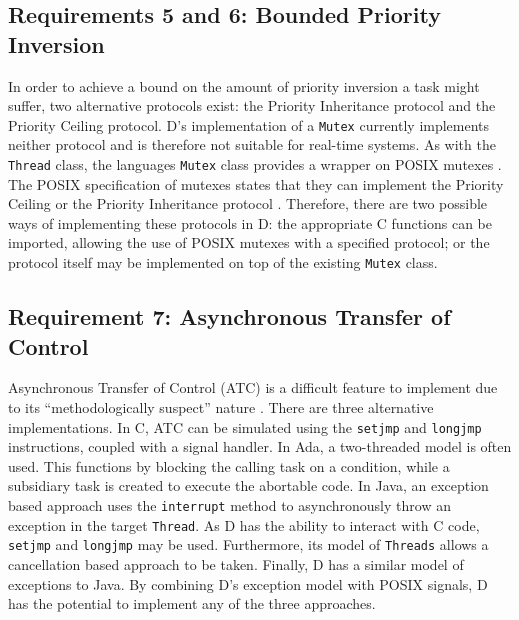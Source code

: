 \subsection{Requirements 5 and 6: Bounded Priority Inversion} %
In order to achieve a bound on the amount of priority inversion a task
might suffer, two alternative protocols exist: the Priority Inheritance protocol and the
Priority Ceiling protocol. D's implementation of a \texttt{Mutex} currently
implements neither protocol and is therefore not suitable for real-time systems.
As with the \texttt{Thread} class, the languages \texttt{Mutex} class provides 
a wrapper on POSIX mutexes \cite{dlang-github-mutex}. 
The POSIX specification of mutexes states that
they can implement the Priority Ceiling or the Priority Inheritance protocol 
\cite{mutex-setprotocol}. Therefore, there are two possible ways of
implementing these protocols in D: 
the appropriate C functions can be imported, allowing the
use of POSIX mutexes with a specified protocol; or the protocol itself may be
implemented on top of the existing \texttt{Mutex} class. 

\subsection{Requirement 7: Asynchronous Transfer of Control} %
Asynchronous Transfer of Control (ATC) is a difficult feature to implement due to
its ``methodologically suspect'' nature \cite{Brosgol:2002:ATC}. There are
three alternative implementations. In C, ATC can be simulated using the
\texttt{setjmp} and \texttt{longjmp} instructions, coupled with a signal
handler. In Ada, a
two-threaded model is often used. This functions by blocking the calling task
on a condition, while a subsidiary task is created to execute the abortable
code. In Java, an exception based approach uses the \texttt{interrupt}
method to asynchronously throw an exception in the target \texttt{Thread}. 
As D has the ability to interact with C code, \texttt{setjmp} and \texttt{longjmp} may be
used. Furthermore, its model of \texttt{Threads} allows a cancellation based
approach to be taken. Finally, D has a similar model of exceptions to Java. By
combining D's exception model with POSIX signals, D has the potential 
to implement any of the three approaches.
